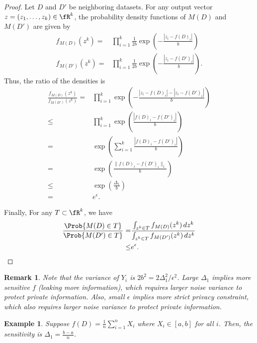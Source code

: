 \documentclass[11pt, a4paper]{article}
\newtheorem{remark}{Remark}
\newtheorem{example}{Example}
\begin{document}
\begin{proof}
Let $D$ and $D'$ be neighboring datasets.
For any output vector $z = (z_1, \dots, z_k)\in\fR^k$,
the probability density functions of $M(D)$ and $M(D')$ are given by
\begin{align}
    f_{M(D)} (z^k)=& \prod_{i=1}^k \frac{1}{2b} \exp\left( - \frac{|z_i-f(D)_i|}{b}\right)\\
    f_{M(D')}(z^k) =& \prod_{i=1}^k \frac{1}{2b} \exp\left( - \frac{|z_i-f(D')_i|}{b}\right).
\end{align}
Thus, the ratio of the densities is
\begin{align}
    \frac{f_{M(D)}(z^k)}{f_{M(D')}(z^k)} 
    =& \prod_{i=1}^k \exp\left( - \frac{|z_i-f(D)_i| - |z_i-f(D')_i|}{b}\right)\\
    \leq & \prod_{i=1}^k \exp\left( \frac{|f(D)_i-f(D')_i|}{b}\right)\\
    = & \exp\left( \sum_{i=1}^k\frac{|f(D)_i-f(D')_i|}{b}\right)\\
    = & \exp\left( \frac{\|f(D)_i-f(D')_i\|_1}{b}\right)\\
    \leq & \exp\left( \frac{\Delta_1}{b}\right)\\
    =& e^{\epsilon}.
\end{align}

Finally, For any $T\subset\fR^k$, we have
\begin{align}
    \frac{\Prob{M(D)\in T}} {\Prob{M(D')\in T}}
    =&\frac{\int_{z^k\in T} f_{M(D)}(z^k) \, dz^k}{\int_{z^k\in T}f_{M(D')}(z^k) \, dz^k} \\
    \leq& e^\epsilon.
\end{align}

\end{proof}

\begin{remark}
    Note that the variance of $Y_i$ is $2b^2 = 2\Delta_1^2/\epsilon^2$.
    Large $\Delta_1$ implies more sensitive $f$ (leaking more information), 
    which requires larger noise variance to protect private information.
    Also, small $\epsilon$ implies more strict privacy constraint,
    which also requires larger noise variance to protect private information.
\end{remark}

\begin{example}
    Suppose $f(D) = \frac{1}{n} \sum_{i=1}^n X_i$ where $X_i \in [a, b]$ for all $i$.
    Then, the sensitivity is $\Delta_1 = \frac{b-a}{n}$.
\end{example}
\end{document}
